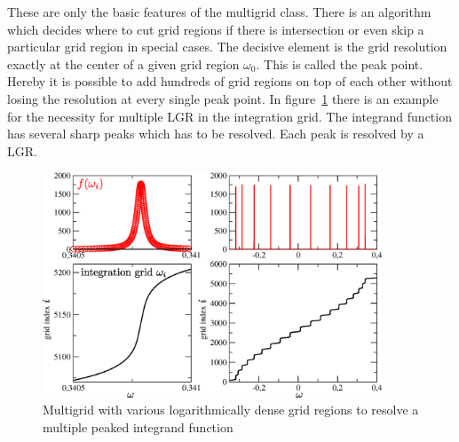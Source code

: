 These are only the basic features of the multigrid class. There is an algorithm which decides where to cut grid regions if there is intersection or even skip a particular grid region in special cases. The decisive element is the grid resolution exactly at the center of a given grid region $\omega_0$. This is called the peak point. Hereby it is possible to add hundreds of grid regions on top of each other without losing the resolution at every single peak point. In figure~\ref{fig:multiple_lgr} there is an example for the necessity for multiple LGR in the integration grid. The integrand function has several sharp peaks which has to be resolved. Each peak is resolved by a LGR.
\begin{figure}[h]
	\centering
	\includegraphics[width=0.9\textwidth]{pics/multiple_loggridregions.eps}
	\caption{Multigrid with various logarithmically dense grid regions to resolve a multiple peaked integrand function}
	\label{fig:multiple_lgr}
\end{figure}